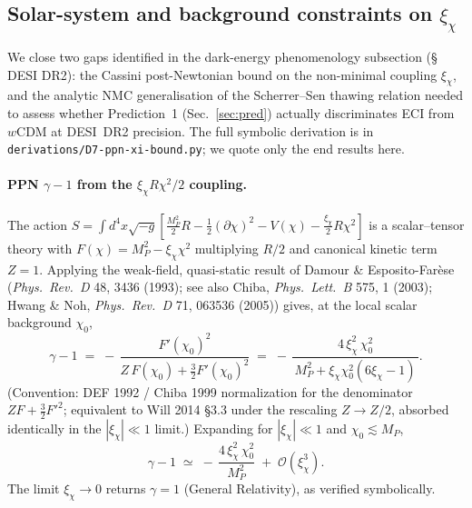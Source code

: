 
\subsection{Solar-system and background constraints on $\xi_\chi$}\label{sec:xi_constraints}

We close two gaps identified in the dark-energy phenomenology subsection (\S\,DESI DR2): the Cassini
post-Newtonian bound on the non-minimal coupling $\xi_\chi$, and the analytic NMC generalisation
of the Scherrer--Sen thawing relation needed to assess whether Prediction~1
(Sec.~\ref{sec:pred}) actually discriminates ECI from \(w\)CDM at DESI~DR2 precision.
The full symbolic derivation is in \texttt{derivations/D7-ppn-xi-bound.py}; we quote only the
end results here.

\paragraph{PPN $\gamma-1$ from the $\xi_\chi R\chi^2/2$ coupling.}
The action  $S=\int d^4x\sqrt{-g}\left[\tfrac{M_P^2}{2}R-\tfrac12(\partial\chi)^2-V(\chi)
-\tfrac{\xi_\chi}{2} R\chi^2\right]$ is a scalar--tensor theory with
$F(\chi)=M_P^2-\xi_\chi\chi^2$ multiplying $R/2$ and canonical kinetic term $Z=1$.
Applying the weak-field, quasi-static result of Damour \& Esposito-Far\`ese
(\emph{Phys.\ Rev.\ D} 48, 3436 (1993); see also Chiba, \emph{Phys.\ Lett.\ B} 575, 1 (2003);
Hwang \& Noh, \emph{Phys.\ Rev.\ D} 71, 063536 (2005)) gives, at the local scalar background
$\chi_0$,
\begin{equation}
  \gamma-1 \;=\; -\,\frac{F'(\chi_0)^2}{Z\,F(\chi_0)+\tfrac{3}{2}F'(\chi_0)^2}
           \;=\; -\,\frac{4\,\xi_\chi^{2}\,\chi_0^{2}}
                          {\,M_P^{2}+\xi_\chi\chi_0^{2}(6\xi_\chi-1)\,}.
  \label{eq:gamma_PPN_full}
\end{equation}
(Convention: DEF 1992 / Chiba 1999 normalization for the denominator
$Z F + \tfrac{3}{2}F'^{2}$; equivalent to Will 2014 \S3.3 under
the rescaling $Z\to Z/2$, absorbed identically in the $|\xi_\chi|\ll 1$ limit.)
Expanding for $|\xi_\chi|\ll 1$ and $\chi_0\lesssim M_P$,
\begin{equation}
  \boxed{\;\gamma-1 \;\simeq\; -\,\frac{4\,\xi_\chi^{2}\,\chi_0^{2}}{M_P^{2}}
                              \;+\;\mathcal{O}(\xi_\chi^{3}).\;}
  \label{eq:gamma_PPN_lead}
\end{equation}
The limit $\xi_\chi\to 0$ returns $\gamma=1$ (General Relativity), as verified symbolically.

